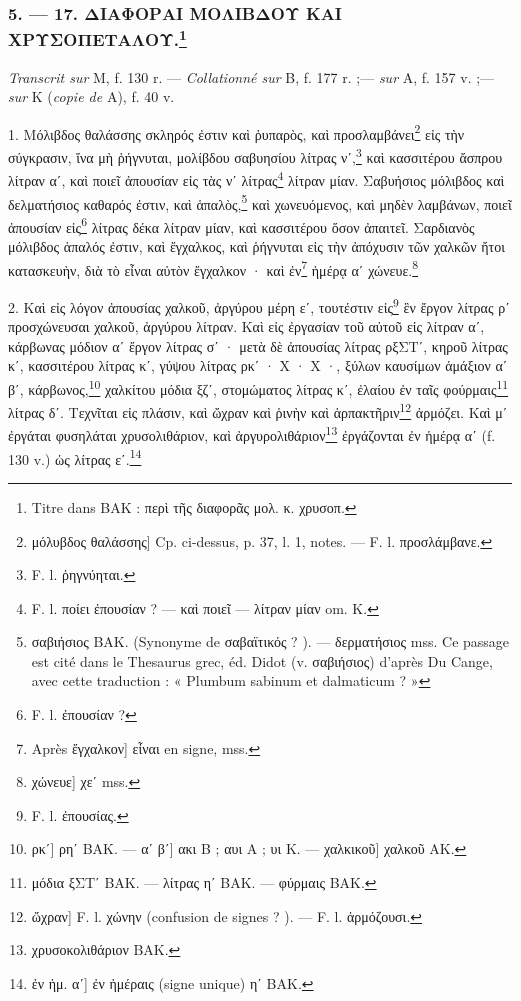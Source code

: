 \documentclass[a4paper, 11pt, oneside, polutonikogreek, french]{article}
\begin{document}
\bigskip
\centerline{\EightStarTaper}
\centerline{\EightStarTaper\EightStarTaper}
\bigskip

\subsubsection[5. --- 17. ΔΙΑΦΟΡΑΙ ΜΟΛΙΒΔΟΥ ΚΑΙ ΧΡΥΣΟΠΕΤΑΛΟΥ.]{5. --- 17. ΔΙΑΦΟΡΑΙ ΜΟΛΙΒΔΟΥ ΚΑΙ ΧΡΥΣΟΠΕΤΑΛΟΥ.\footnote{Titre dans BAK : περὶ τῆς διαφορᾶς μολ. κ. χρυσοπ.}}

\emph{Transcrit sur} M, f. 130 r. --- \emph{Collationné sur} B, f. 177 r. ;--- \emph{sur} A, f. 157 v. ;--- \emph{sur} K (\emph{copie de} A), f. 40 v.

\bigskip

1. Μόλιβδος θαλάσσης σκληρός ἐστιν καὶ ῥυπαρὸς, καὶ προσλαμβάνει\footnote{μόλυβδος θαλάσσης] Cp. ci-dessus, p. 37, l. 1, notes. --- F. l. προσλάμβανε.} εἰς τὴν σύγκρασιν, ἵνα μὴ ῥήγνυται, μολίβδου σαβυησίου λίτρας νʹ,\footnote{F. l. ῥηγνύηται.} καὶ κασσιτέρου ἄσπρου λίτραν αʹ, καὶ ποιεῖ ἀπουσίαν εἰς τὰς νʹ λίτρας\footnote{F. l.  ποίει ἐπουσίαν ? --- καὶ ποιεῖ --- λίτραν μίαν om. Κ.} λίτραν μίαν. Σαβυήσιος μόλιβδος καὶ δελματήσιος καθαρός ἐστιν, καὶ ἁπαλὸς,\footnote{σαβιήσιος BAK. (Synonyme de σαβαϊτικός ? ). --- δερματήσιος mss. Ce passage est cité dans le Thesaurus grec, éd. Didot (v. σαβιήσιος) d'après Du Cange, avec cette traduction : « Plumbum sabinum et dalmaticum ? »} καὶ χωνευόμενος, καὶ μηδὲν λαμβάνων, ποιεῖ ἀπουσίαν εἰς\footnote{F. l. ἐπουσίαν ?} λίτρας δέκα λίτραν μίαν, καὶ κασσιτέρου ὅσον ἀπαιτεῖ. Σαρδιανὸς μόλιβδος ἁπαλός ἐστιν, καὶ ἔγχαλκος, καὶ ῥήγνυται εἰς τὴν ἀπόχυσιν τῶν χαλκῶν ἤτοι κατασκευὴν, διὰ τὸ εἶναι αὐτὸν ἔγχαλκον · καὶ ἐν\footnote{Après ἔγχαλκον] εἶναι en signe, mss.} ἡμέρᾳ αʹ χώνευε.\footnote{χώνευε] χεʹ mss.}

2. Καὶ εἰς λόγον ἀπουσίας χαλκοῦ, ἀργύρου μέρη εʹ, τουτέστιν εἰς\footnote{F. l. ἐπουσίας.} ἓν ἔργον λίτρας ρʹ προσχώνευσαι χαλκοῦ, ἀργύρου λίτραν. Καὶ εἰς ἐργασίαν τοῦ αὐτοῦ εἰς λίτραν αʹ, κάρβωνας μόδιον αʹ ἔργον λίτρας σʹ · μετὰ δὲ ἀπουσίας λίτρας ρξΣΤʹ, κηροῦ λίτρας κʹ, κασσιτέρου λίτρας κʹ, γύψου λίτρας ρκʹ · Χ · Χ ·, ξύλων καυσίμων ἁμάξιον αʹ βʹ, κάρβωνος,\footnote{ρκʹ] ρηʹ BAK. --- αʹ βʹ] ακι B ; αυι A ; υι K. --- χαλκικοῦ] χαλκοῦ AK.} χαλκίτου μόδια ξζʹ, στομώματος λίτρας κʹ, ἐλαίου ἐν ταῖς φούρμαις\footnote{μόδια ξΣΤʹ BAK. --- λίτρας ηʹ BAK. --- φύρμαις BAK.} λίτρας δʹ. Τεχνῖται εἰς πλάσιν, καὶ ὤχραν καὶ ῥινὴν καὶ ἁρπακτῆριν\footnote{ὤχραν] F. l. χώνην (confusion de signes ? ). --- F. l. ἁρμόζουσι.} ἀρμόζει. Καὶ μʹ ἐργάται φυσηλάται χρυσολιθάριον, καὶ ἀργυρολιθάριον\footnote{χρυσοκολιθάριον BAK.} ἐργάζονται ἐν ἡμέρᾳ αʹ (f. 130 v.) ὡς λίτρας εʹ.\footnote{ἐν ἡμ. αʹ] ἐν ἠμέραις (signe unique) ηʹ BAK.}
\end{document}
